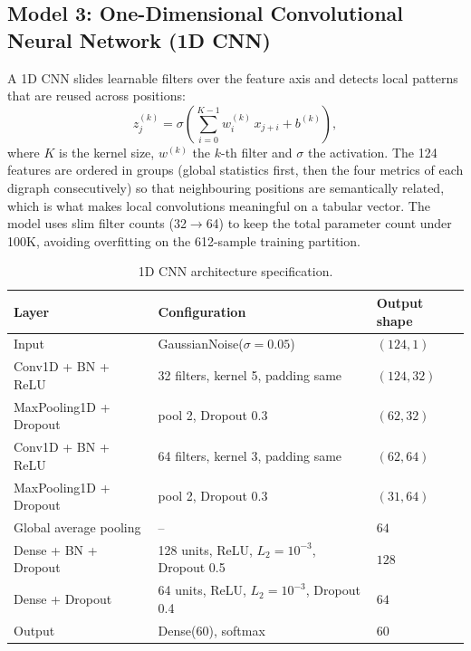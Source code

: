 \subsection{Model 3: One-Dimensional Convolutional Neural Network (1D CNN)}
A 1D CNN slides learnable filters over the feature axis and detects local patterns that are reused across positions:
\begin{equation}
z_{j}^{(k)}=\sigma\!\left(\sum_{i=0}^{K-1} w_{i}^{(k)}\,x_{j+i}+b^{(k)}\right),
\end{equation}
where $K$ is the kernel size, $w^{(k)}$ the $k$-th filter and $\sigma$ the activation. The 124 features are ordered in groups (global statistics first, then the four metrics of each digraph consecutively) so that neighbouring positions are semantically related, which is what makes local convolutions meaningful on a tabular vector. The model uses slim filter counts (32$\to$64) to keep the total parameter count under 100K, avoiding overfitting on the 612-sample training partition.

\begin{table}[H]
\centering
\caption{1D CNN architecture specification.}
\begin{tabular}{@{}lll@{}}
\toprule
\textbf{Layer} & \textbf{Configuration} & \textbf{Output shape} \\ \midrule
Input & GaussianNoise($\sigma=0.05$) & $(124,1)$ \\
Conv1D + BN + ReLU & 32 filters, kernel 5, padding same & $(124,32)$ \\
MaxPooling1D + Dropout & pool 2, Dropout 0.3 & $(62,32)$ \\
Conv1D + BN + ReLU & 64 filters, kernel 3, padding same & $(62,64)$ \\
MaxPooling1D + Dropout & pool 2, Dropout 0.3 & $(31,64)$ \\
Global average pooling & -- & $64$ \\
Dense + BN + Dropout & 128 units, ReLU, $L_2=10^{-3}$, Dropout 0.5 & $128$ \\
Dense + Dropout & 64 units, ReLU, $L_2=10^{-3}$, Dropout 0.4 & $64$ \\
Output & Dense(60), softmax & $60$ \\ \bottomrule
\end{tabular}
\end{table}

